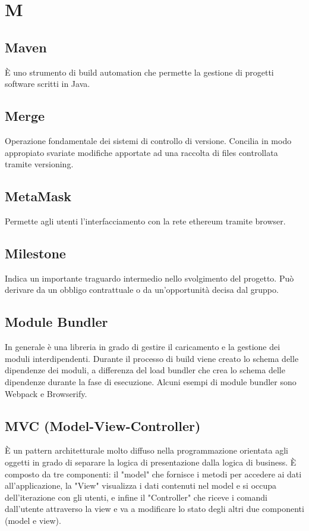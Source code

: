 \section*{M}

\subsection{Maven}
È uno strumento di build automation che permette la gestione di progetti software scritti in Java.

\subsection{Merge} 
Operazione fondamentale dei sistemi di controllo di versione. Concilia in modo appropiato svariate modifiche apportate ad una raccolta di files controllata tramite versioning.

\subsection{MetaMask}
Permette agli utenti l'interfacciamento con la rete ethereum tramite browser.

\subsection{Milestone} 
Indica un importante traguardo intermedio nello svolgimento del progetto. Può derivare da un obbligo contrattuale o da un'opportunità decisa dal gruppo.

\subsection{Module Bundler}
In generale è una libreria in grado di gestire il caricamento e la gestione dei moduli interdipendenti. Durante il processo di build viene creato lo schema delle dipendenze dei moduli, a differenza del load bundler che crea lo schema delle dipendenze durante la fase di esecuzione. Alcuni esempi di module bundler sono Webpack e Browserify.

\subsection{MVC (Model-View-Controller)}
È un pattern architetturale molto diffuso nella programmazione orientata agli oggetti in grado di separare la logica di presentazione dalla logica di business. È composto da tre componenti: il "model" che fornisce i metodi per accedere ai dati all'applicazione, la "View" visualizza i dati contenuti nel model e si occupa dell'iterazione con gli utenti, e infine il "Controller" che riceve i comandi dall'utente attraverso la view e va a modificare lo stato degli altri due componenti (model e view).
